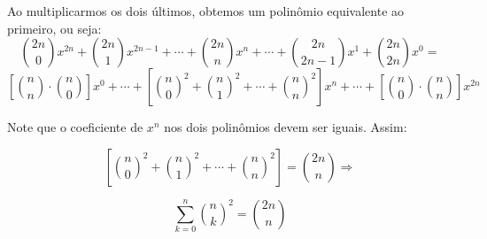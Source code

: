 \documentclass[12pt, a4paper]{article}
\begin{document}
\begin{solution}
Ao multiplicarmos os dois últimos, obtemos um polinômio equivalente ao primeiro, ou seja:
$$\binom{2n}{0}x^{2n}+ \binom{2n}{1} x^{2n-1}+ \cdots + \binom{2n}{n}x^{n}+ \cdots + \binom{2n}{2n-1}x^{1}+ \binom{2n}{2n}x^{0} =$$
$$\left[ \binom{n}{n}\cdot \binom{n}{0}  \right] x^{0}+ \cdots +\left[  \binom{n}{0} ^{2}+ \binom{n}{1}^{2}+ \cdots + \binom{n}{n}^{2} \right]x^{n}+ \cdots +  \left[  \binom{n}{0}\cdot \binom{n}{n} \right]x^{2n}$$

Note que o coeficiente de $x^{n}$ nos dois polinômios devem ser iguais. Assim:

$$ \left[  \binom{n}{0}^{2}+ \binom{n}{1}^{2}+ \cdots + \binom{n}{n}^{2} \right] = \binom{2n}{n} \Rightarrow$$

$$\sum_{k=0}^{n} \binom{n}{k}^{2}= \binom{2n}{n}$$


\end{solution}
\end{document}
